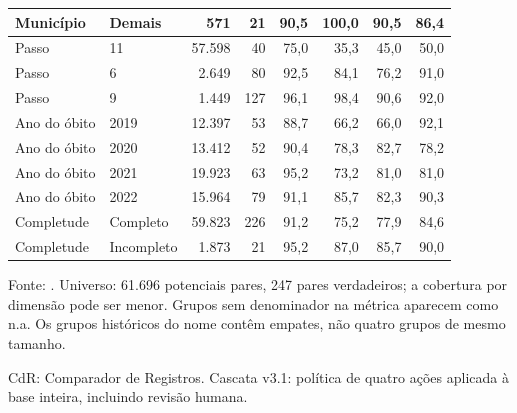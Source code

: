 \begin{table}[htbp]
{\begin{tabular}{llrrrrrr}
Munic\'ipio & Demais & 571 & 21 & 90{,}5 & 100{,}0 & 90{,}5 & 86{,}4 \\
\midrule
Passo & 11 & 57.598 & 40 & 75{,}0 & 35{,}3 & 45{,}0 & 50{,}0 \\
Passo & 6 & 2.649 & 80 & 92{,}5 & 84{,}1 & 76{,}2 & 91{,}0 \\
Passo & 9 & 1.449 & 127 & 96{,}1 & 98{,}4 & 90{,}6 & 92{,}0 \\
\midrule
Ano do \'obito & 2019 & 12.397 & 53 & 88{,}7 & 66{,}2 & 66{,}0 & 92{,}1 \\
Ano do \'obito & 2020 & 13.412 & 52 & 90{,}4 & 78{,}3 & 82{,}7 & 78{,}2 \\
Ano do \'obito & 2021 & 19.923 & 63 & 95{,}2 & 73{,}2 & 81{,}0 & 81{,}0 \\
Ano do \'obito & 2022 & 15.964 & 79 & 91{,}1 & 85{,}7 & 82{,}3 & 90{,}3 \\
\midrule
Completude & Completo & 59.823 & 226 & 91{,}2 & 75{,}2 & 77{,}9 & 84{,}6 \\
Completude & Incompleto & 1.873 & 21 & 95{,}2 & 87{,}0 & 85{,}7 & 90{,}0 \\
\bottomrule
\end{tabular}}
\par\footnotesize Fonte: . Universo: 61.696 potenciais pares, 247 pares verdadeiros; a cobertura por dimensão pode ser menor. Grupos sem denominador na métrica aparecem como n.a. Os grupos históricos do nome contêm empates, não quatro grupos de mesmo tamanho.
\par\footnotesize CdR: Comparador de Registros. Cascata v3.1: política de quatro ações aplicada à base inteira, incluindo revisão humana.
\end{table}
